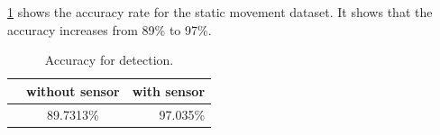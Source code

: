 \ref{t:acc_stat} shows the accuracy rate for the static movement dataset.
It shows that the accuracy increases from 89\% to 97\%.

\begin{table}[h!]
  \centering
  \caption{Accuracy for detection.}
  \label{t:acc_stat}
  \begin{tabular}{  l  c | r  }
   
     & without sensor & with sensor  \\
    \hline
    & 89.7313\% & 97.035\%  \\
    \hline
  \end{tabular}
\end{table}





